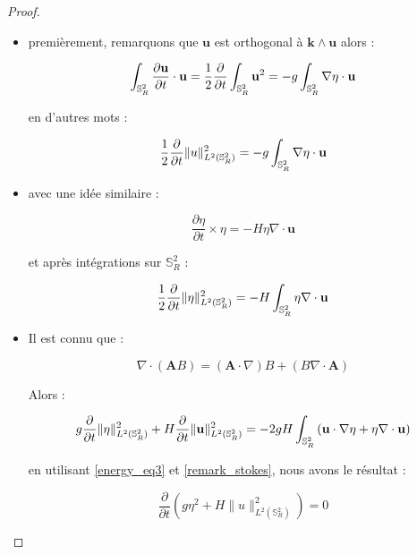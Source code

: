 \begin{proof}
\begin{itemize}
\item premièrement, remarquons que $\mathbf{u}$ est orthogonal à $\mathbf{k} \wedge \mathbf{u}$ alors :

$$\displaystyle\int_{\mathbb{S}_R^2} \dfrac{\partial \mathbf{u}}{\partial t} \cdot \mathbf{u} = \dfrac{1}{2} \dfrac{\partial}{\partial t} \displaystyle\int_{\mathbb{S}_R^2} \mathbf{u}^2 = -g \displaystyle\int_{\mathbb{S}_R^2} \nabla \eta \cdot \mathbf{u}$$

en d'autres mots :

\begin{equation}
\dfrac{1}{2} \dfrac{\partial}{\partial t} \| u \|_{L^2(\mathbb{S}_R^2)}^2 = -g \displaystyle\int_{\mathbb{S}_R^2} \nabla \eta \cdot \mathbf{u}
\label{energy_eq1}
\end{equation}

\item avec une idée similaire :

$$\dfrac{\partial \eta}{\partial t} \times \eta = -H \eta \nabla \cdot \mathbf{u} $$

et après intégrations sur $\mathbb{S}_R^2$ :

\begin{equation}
\dfrac{1}{2} \dfrac{\partial}{\partial t} \| \eta \|^2_{L^2(\mathbb{S}_R^2)} = -H \displaystyle\int_{\mathbb{S}_R^2} \eta \nabla \cdot \mathbf{u}
\label{energy_eq2}
\end{equation}

\item Il est connu que :

\begin{equation}
\nabla \cdot \left( \mathbf{A} B \right) = \left( \mathbf{A} \cdot \nabla \right) B + \left( B \nabla \cdot \mathbf{A} \right)
\label{energy_eq3}
\end{equation}

Alors :

$$g \dfrac{\partial}{\partial t}  \| \eta \|^2_{L^2(\mathbb{S}_R^2)} + H \dfrac{\partial}{\partial t} \| \mathbf{u} \|^2_{L^2(\mathbb{S}_R^2)} = -2gH \displaystyle\int_{\mathbb{S}_R^2} \left( \mathbf{u} \cdot \nabla \eta + \eta \nabla \cdot \mathbf{u} \right)$$

en utilisant \eqref{energy_eq3} et \ref{remark_stokes}, nous avons le résultat :

\begin{equation}
\dfrac{\partial}{\partial t} \left( g  \eta^2 + H \| u \|_{L^2(\mathbb{S}_R^2)}^2 \right) = 0
\end{equation}
\end{itemize}
\end{proof}

